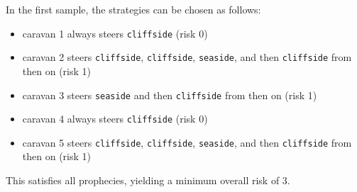 \remainingsamples

In the first sample, the strategies can be chosen as follows:
\begin{itemize}
	\item caravan 1 always steers \texttt{cliffside} (risk 0)
	\item caravan 2 steers \texttt{cliffside}, \texttt{cliffside}, \texttt{seaside}, and then \texttt{cliffside} from then on (risk 1)
	\item caravan 3 steers \texttt{seaside} and then \texttt{cliffside} from then on (risk 1)
	\item caravan 4 always steers \texttt{cliffside} (risk 0)
	\item caravan 5 steers \texttt{cliffside}, \texttt{cliffside}, \texttt{seaside}, and then \texttt{cliffside} from then on (risk 1)
\end{itemize}
This satisfies all prophecies, yielding a minimum overall risk of 3.